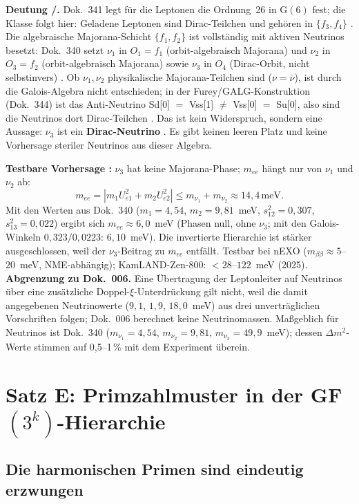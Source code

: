\textbf{Deutung \BM/\SM.} Dok.~341 legt für die Leptonen die Ordnung~26 in G$(6)$
fest; die Klasse folgt hier: Geladene Leptonen sind Dirac-Teilchen und gehören
in $\{f_3,f_4\}$ \BM. Die algebraische Majorana-Schicht $\{f_1,f_2\}$ ist
vollständig mit aktiven Neutrinos besetzt: Dok.~340 setzt $\nu_1$ in $O_1=f_1$
(orbit-algebraisch Majorana) und $\nu_2$ in $O_3=f_2$ (orbit-algebraisch
Majorana) sowie $\nu_3$ in $O_4$ (Dirac-Orbit, nicht selbstinvers) \BM.
Ob $\nu_1,\nu_2$ physikalische Majorana-Teilchen sind ($\nu=\bar\nu$), ist
durch die Galois-Algebra nicht entschieden; in der Furey/GALG-Konstruktion
(Dok.~344) ist das Anti-Neutrino Sd[0] $=$ Vss[1] $\neq$ Vss[0] $=$ Su[0],
also sind die Neutrinos dort Dirac-Teilchen \SM. Das ist kein Widerspruch, sondern eine Aussage: $\nu_3$ ist ein
\textbf{Dirac-Neutrino} \BM. Es gibt keinen leeren Platz und keine Vorhersage
steriler Neutrinos aus dieser Algebra.

\textbf{Testbare Vorhersage \BM:} $\nu_3$ hat keine Majorana-Phase;
$m_{ee}$ hängt nur von $\nu_1$ und $\nu_2$ ab:
\[
  m_{ee} = |m_1 U_{e1}^2 + m_2 U_{e2}^2|
  \leq m_{\nu_1} + m_{\nu_2} \approx 14{,}4\,\text{meV}.
\]
Mit den Werten aus Dok.~340 ($m_1 = 4{,}54$, $m_2 = 9{,}81$~meV, $s_{12}^2 = 0{,}307$, $s_{13}^2 = 0{,}022$) ergibt sich $m_{ee}\approx 6{,}0$~meV (Phasen null, ohne $\nu_3$; mit den Galois-Winkeln $0{,}323/0{,}0223$: $6{,}10$~meV). Die invertierte Hierarchie ist
stärker ausgeschlossen, weil der $\nu_3$-Beitrag zu $m_{ee}$ entfällt.
Testbar bei nEXO ($m_{\beta\beta}\approx5$--$20$~meV, NME-abhängig); KamLAND-Zen-800: $<28$--$122$~meV (2025).
\textbf{Abgrenzung zu Dok.~006.} Eine Übertragung der Leptonleiter auf
Neutrinos über eine zusätzliche Doppel-$\xi$-Unterdrückung gilt nicht, weil die
damit angegebenen Neutrinowerte ($9{,}1$, $1{,}9$, $18{,}0$~meV) aus drei
unverträglichen Vorschriften folgen; Dok.~006 berechnet keine Neutrinomassen.
Maßgeblich für Neutrinos ist Dok.~340 ($m_{\nu_1}=4{,}54$, $m_{\nu_2}=9{,}81$,
$m_{\nu_3}=49{,}9$~meV); dessen $\Delta m^2$-Werte stimmen auf 0,5--1\,\%
mit dem Experiment überein.




\section{Satz E: Primzahlmuster in der GF$(3^k)$-Hierarchie}

\subsection{Die harmonischen Primen sind eindeutig erzwungen}

